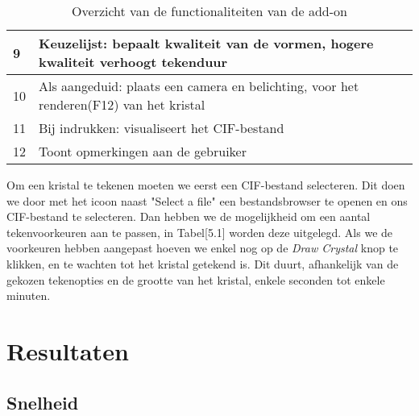\begin{table}[H]
\begin{tabular}{|l|l|}
9  & Keuzelijst: bepaalt kwaliteit van de vormen, hogere kwaliteit verhoogt tekenduur                                                                                                                                                                                     \\ \hline
10 & Als aangeduid: plaats een camera en belichting, voor het renderen(F12) van het kristal                                                                                                                                                                               \\ \hline
11 & Bij indrukken: visualiseert het CIF-bestand                                                                                                                                                                                                                          \\ \hline
12 & Toont opmerkingen aan de gebruiker                                                                                                                                                                                                                                   \\ \hline
\end{tabular}
\caption{Overzicht van de functionaliteiten van de add-on}
\end{table}

Om een kristal te tekenen moeten we eerst een CIF-bestand selecteren. Dit doen we door met het icoon naast "Select a file" een bestandsbrowser te openen en ons CIF-bestand te selecteren. Dan hebben we de mogelijkheid om een aantal tekenvoorkeuren aan te passen, in Tabel[5.1] worden deze uitgelegd. Als we de voorkeuren hebben aangepast hoeven we enkel nog op de \textit{Draw Crystal} knop te klikken, en te wachten tot het kristal getekend is. Dit duurt, afhankelijk van de gekozen tekenopties en de grootte van het kristal, enkele seconden tot enkele minuten.
\par
  
\section{Resultaten}

\subsection{Snelheid}

